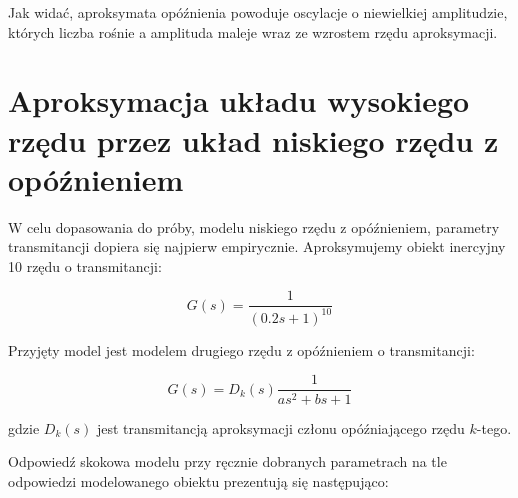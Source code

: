 \documentclass[12pt]{article}
\begin{document}
Jak widać, aproksymata opóźnienia powoduje oscylacje o niewielkiej amplitudzie,
których liczba rośnie a amplituda maleje wraz ze wzrostem rzędu aproksymacji.

\newpage

\section{Aproksymacja układu wysokiego rzędu przez układ niskiego rzędu z
opóźnieniem}

W celu dopasowania do próby, modelu niskiego rzędu z opóźnieniem, parametry
transmitancji dopiera się najpierw empirycznie. Aproksymujemy obiekt inercyjny
10 rzędu o transmitancji:

\begin{equation*}
	G(s)=\frac{1}{(0.2s+1)^{10}}
\end{equation*}

Przyjęty model jest modelem drugiego rzędu z opóźnieniem o transmitancji:

\begin{equation*}
	G(s)=D_k(s)\frac{1}{as^2+bs+1}
\end{equation*}

gdzie $D_k(s)$ jest transmitancją aproksymacji członu opóźniającego
rzędu $k$-tego.

Odpowiedź skokowa modelu przy ręcznie dobranych parametrach na tle odpowiedzi
modelowanego obiektu prezentują się następująco:
\end{document}
